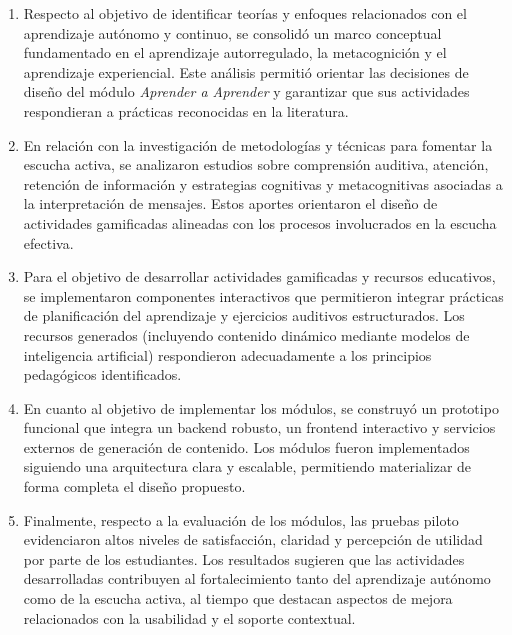 \begin{enumerate}
    \item Respecto al objetivo de identificar teorías y enfoques relacionados con el aprendizaje autónomo y continuo, se consolidó un marco conceptual fundamentado en el aprendizaje autorregulado, la metacognición y el aprendizaje experiencial. Este análisis permitió orientar las decisiones de diseño del módulo \textit{Aprender a Aprender} y garantizar que sus actividades respondieran a prácticas reconocidas en la literatura.

    \item En relación con la investigación de metodologías y técnicas para fomentar la escucha activa, se analizaron estudios sobre comprensión auditiva, atención, retención de información y estrategias cognitivas y metacognitivas asociadas a la interpretación de mensajes. Estos aportes orientaron el diseño de actividades gamificadas alineadas con los procesos involucrados en la escucha efectiva.

    \item Para el objetivo de desarrollar actividades gamificadas y recursos educativos, se implementaron componentes interactivos que permitieron integrar prácticas de planificación del aprendizaje y ejercicios auditivos estructurados. Los recursos generados (incluyendo contenido dinámico mediante modelos de inteligencia artificial) respondieron adecuadamente a los principios pedagógicos identificados.

    \item En cuanto al objetivo de implementar los módulos, se construyó un prototipo funcional que integra un backend robusto, un frontend interactivo y servicios externos de generación de contenido. Los módulos fueron implementados siguiendo una arquitectura clara y escalable, permitiendo materializar de forma completa el diseño propuesto.

    \item Finalmente, respecto a la evaluación de los módulos, las pruebas piloto evidenciaron altos niveles de satisfacción, claridad y percepción de utilidad por parte de los estudiantes. Los resultados sugieren que las actividades desarrolladas contribuyen al fortalecimiento tanto del aprendizaje autónomo como de la escucha activa, al tiempo que destacan aspectos de mejora relacionados con la usabilidad y el soporte contextual.
\end{enumerate}

